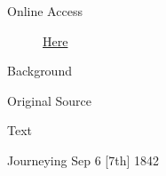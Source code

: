 			\begin{description}
				\item[Online Access] \href{https://www.josephsmithpapers.org/paper-summary/letter-to-the-church-7-september-1842-dc-128/1}{Here}
			\end{description}
			
			\begin{description}
				\item[Background]
			\end{description}
			
			
			\begin{description}
				\item[Original Source]
			\end{description}
			
			
			\begin{description}
				\item[Text]
			\end{description}
			
				\begin{tightright}
					Journeying Sep\supers{.} 6 [7th] 1842
				\end{tightright}

